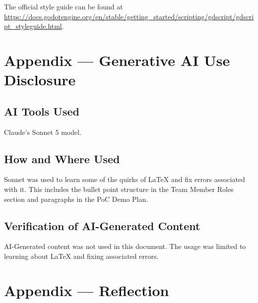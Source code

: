 \documentclass{article}
\begin{document}
\par\medskip

\noindent The official style guide can be found at \url{https://docs.godotengine.org/en/stable/getting_started/scripting/gdscript/gdscript_styleguide.html}.


\newpage{}

\section{Appendix --- Generative AI Use Disclosure}



\subsection{AI Tools Used}

Claude's Sonnet 5 model.

\subsection{How and Where Used}

Sonnet was used to learn some of the quirks of LaTeX and fix errors associated with it. This includes the bullet point structure in the Team Member Roles section and paragraphs in the PoC Demo Plan.


\subsection{Verification of AI-Generated Content}

AI-Generated content was not used in this document. The usage was limited to learning about LaTeX and fixing associated errors.

\newpage{}

\section*{Appendix --- Reflection}


\end{document}
